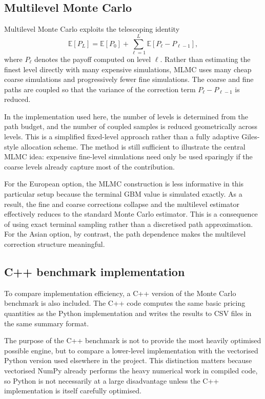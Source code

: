 \documentclass[11pt]{article}
\begin{document}
\subsection{Multilevel Monte Carlo}

Multilevel Monte Carlo exploits the telescoping identity
\begin{equation}
\mathbb{E}[P_L] = \mathbb{E}[P_0] + \sum_{\ell=1}^{L}\mathbb{E}[P_\ell - P_{\ell-1}],
\end{equation}
where $P_\ell$ denotes the payoff computed on level $\ell$. Rather than estimating the finest level directly with many expensive simulations, MLMC uses many cheap coarse simulations and progressively fewer fine simulations. The coarse and fine paths are coupled so that the variance of the correction term $P_\ell - P_{\ell-1}$ is reduced.

In the implementation used here, the number of levels is determined from the path budget, and the number of coupled samples is reduced geometrically across levels. This is a simplified fixed-level approach rather than a fully adaptive Giles-style allocation scheme. The method is still sufficient to illustrate the central MLMC idea: expensive fine-level simulations need only be used sparingly if the coarse levels already capture most of the contribution.

For the European option, the MLMC construction is less informative in this particular setup because the terminal GBM value is simulated exactly. As a result, the fine and coarse corrections collapse and the multilevel estimator effectively reduces to the standard Monte Carlo estimator. This is a consequence of using exact terminal sampling rather than a discretised path approximation. For the Asian option, by contrast, the path dependence makes the multilevel correction structure meaningful.

\subsection{C++ benchmark implementation}

To compare implementation efficiency, a C++ version of the Monte Carlo benchmark is also included. The C++ code computes the same basic pricing quantities as the Python implementation and writes the results to CSV files in the same summary format.

The purpose of the C++ benchmark is not to provide the most heavily optimised possible engine, but to compare a lower-level implementation with the vectorised Python version used elsewhere in the project. This distinction matters because vectorised NumPy already performs the heavy numerical work in compiled code, so Python is not necessarily at a large disadvantage unless the C++ implementation is itself carefully optimised.
\end{document}

